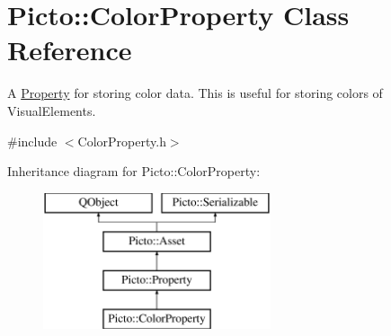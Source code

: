 \hypertarget{class_picto_1_1_color_property}{\section{Picto\-:\-:Color\-Property Class Reference}
\label{class_picto_1_1_color_property}
}


A \hyperlink{class_picto_1_1_property}{Property} for storing color data. This is useful for storing colors of Visual\-Elements.  




{\ttfamily \#include $<$Color\-Property.\-h$>$}

Inheritance diagram for Picto\-:\-:Color\-Property\-:\begin{figure}[H]
\begin{center}
\leavevmode
\includegraphics[height=4.000000cm]{class_picto_1_1_color_property}
\end{center}
\end{figure}
